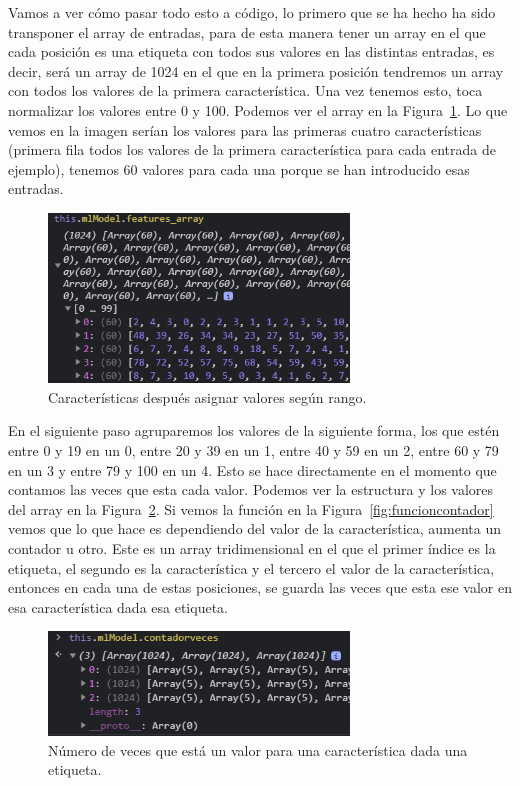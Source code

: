\documentclass[a4paper, 12pt]{book}
\begin{document}
Vamos a ver cómo pasar todo esto a código, lo primero que se ha hecho ha sido transponer el array de entradas, para de esta manera tener un array en el que cada posición es una etiqueta con todos sus valores en las distintas entradas, es decir, será un array de 1024 en el que en la primera posición tendremos un array con todos los valores de la primera característica. Una vez tenemos esto, toca normalizar los valores entre 0 y 100. Podemos ver el array en la Figura~\ref{fig:caracteristicasnormalizadas}. Lo que vemos en la imagen serían los valores para las primeras cuatro características (primera fila todos los valores de la primera característica para cada entrada de ejemplo), tenemos 60 valores para cada una porque se han introducido esas entradas.

\begin{figure}
	\centering
	\includegraphics[width=8cm, keepaspectratio]{img/caracteristicasnormalizadas}
	\caption{Características después asignar valores según rango.}			
	\label{fig:caracteristicasnormalizadas}
\end{figure}

En el siguiente paso agruparemos los valores de la siguiente forma, los que estén entre 0 y 19 en un 0, entre 20 y 39 en un 1, entre 40 y 59 en un 2, entre 60 y 79 en un 3 y entre 79 y 100 en un 4. Esto se hace directamente en el momento que contamos las veces que esta cada valor. Podemos ver la estructura y los valores del array en la Figura~\ref{fig:vecesvalor}. Si vemos la función en la Figura~\ref{fig:funcioncontador} vemos que lo que hace es dependiendo del valor de la característica, aumenta un contador u otro. Este es un array tridimensional en el que el primer índice es la etiqueta, el segundo es la característica y el tercero el valor de la característica, entonces en cada una de estas posiciones, se guarda las veces que esta ese valor en esa característica dada esa etiqueta.

\begin{figure}
	\centering
	\includegraphics[width=8cm, keepaspectratio]{img/vecesvalor}
	\caption{Número de veces que está un valor para una característica dada una etiqueta.}			
	\label{fig:vecesvalor}
\end{figure}
\end{document}
